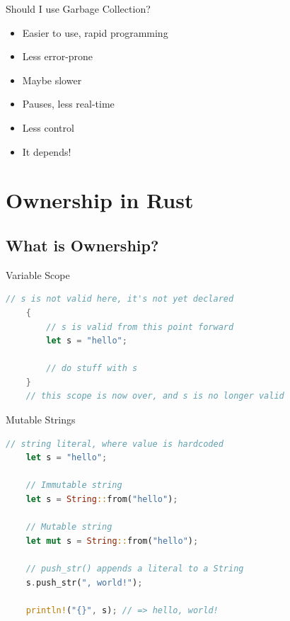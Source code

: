 \begin{Frame}{Should I use Garbage Collection?}
  \begin{itemize}
    \item Easier to use, rapid programming
    \item Less error-prone
  \end{itemize}
  \xxx

  \begin{itemize}
    \item Maybe slower
    \item Pauses, less real-time
    \item Less control
  \end{itemize}
  \xxx

  \pause
  \begin{itemize}
    \item It depends!
  \end{itemize}
\end{Frame}

\section{Ownership in Rust}

\subsection{What is Ownership?}

\lstset{basicstyle=\ttfamily\scriptsize}

\begin{Frame}[fragile]{Variable Scope}
  \begin{lstlisting}[language=Rust,gobble=4]
    // s is not valid here, it's not yet declared
    {                      
        // s is valid from this point forward
        let s = "hello";

        // do stuff with s
    }
    // this scope is now over, and s is no longer valid
  \end{lstlisting}
\end{Frame}

\begin{Frame}[fragile]{Mutable Strings}
  \begin{lstlisting}[language=Rust,gobble=4]
    // string literal, where value is hardcoded
    let s = "hello";

    // Immutable string
    let s = String::from("hello");

    // Mutable string
    let mut s = String::from("hello");

    // push_str() appends a literal to a String
    s.push_str(", world!"); 

    println!("{}", s); // => hello, world!
  \end{lstlisting}
\end{Frame}

